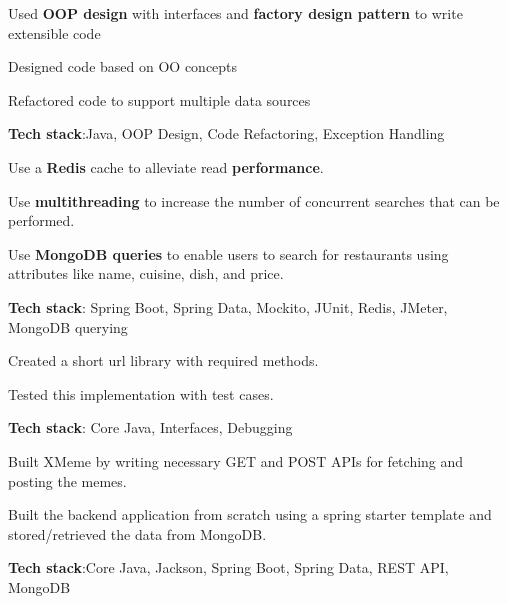 \documentclass[]{deedy-resume-openfont}
\begin{document}
\begin{minipage}[t]{0.66\textwidth}

\begin{tightemize}
\item Used \textbf{OOP design} with interfaces and \textbf{factory design pattern } to write extensible code
\item Designed code based on OO concepts
\item Refactored code to support multiple data sources
\item \textbf{Tech stack}:Java, OOP Design, Code Refactoring, Exception Handling
\end{tightemize}


\begin{tightemize}
\item Use a \textbf{Redis} cache to alleviate read \textbf{performance}.
\item Use \textbf{multithreading} to increase the number of concurrent searches that can be performed.
\item Use \textbf{MongoDB queries} to enable users to search for restaurants using attributes like name, cuisine, dish, and price.

\item \textbf{Tech stack}: Spring Boot, Spring Data, Mockito, JUnit, Redis, JMeter, MongoDB querying
\end{tightemize}



\begin{tightemize}
\item Created a short url library with required methods.
\item Tested this implementation with test cases.
\item \textbf{Tech stack}: Core Java, Interfaces, Debugging
\end{tightemize}




\begin{tightemize}
\item Built XMeme by writing necessary GET and POST APIs for fetching and posting the memes.
\item Built the backend application from scratch using a spring starter template and stored/retrieved the data from MongoDB.
\item \textbf{Tech stack}:Core Java, Jackson, Spring Boot, Spring Data, REST API, MongoDB
\end{tightemize}



\end{minipage}
\end{document}
